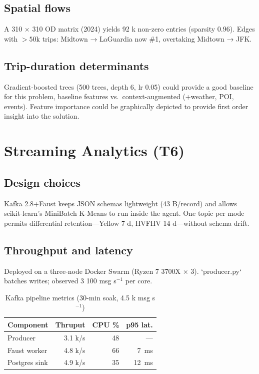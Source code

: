 \documentclass[conference]{IEEEtran}
\begin{document}
  \subsection{Spatial flows}
  A 310 × 310 OD matrix (2024) yields 92 k non-zero entries
  (sparsity 0.96).
  Edges with \(>\!50\text{k}\) trips: Midtown → LaGuardia now \#1,
  overtaking Midtown → JFK.

  \subsection{Trip-duration determinants}
  Gradient-boosted trees (500 trees, depth 6, lr 0.05) could provide a good baseline for this problem,
  baseline features vs.\ context-augmented (+weather, POI, events).
  Feature importance could be graphically depicted to provide first order insight into the solution.

  \section{Streaming Analytics (T6)}\label{sec:stream}
  \subsection{Design choices}
  Kafka 2.8+Faust keeps JSON schemas lightweight (43 B/record) and
  allows scikit-learn's MiniBatch K-Means to run inside the agent.
  One topic per mode permits differential retention—Yellow 7 d,
  HVFHV 14 d—without schema drift.

  \subsection{Throughput and latency}
  Deployed on a three-node Docker Swarm (Ryzen 7 3700X × 3).
  `producer.py` batches writes; observed 3 100 msg s\(^{-1}\) per core.

  \begin{table}[htbp]
    \caption{Kafka pipeline metrics (30-min soak, 4.5 k msg s\(^{-1}\))}
    \label{tab:kafka-metrics}
    \centering
    \begin{tabular}{lrrr}
      \toprule
      Component & Thruput & CPU \% & p95 lat. \\ \midrule
      Producer        & 3.1 k/s & 48 & — \\
      Faust worker    & 4.8 k/s & 66 & \SI{7}{ms} \\
      Postgres sink   & 4.9 k/s & 35 & \SI{12}{ms} \\
      \bottomrule
    \end{tabular}
  \end{table}
\end{document}
